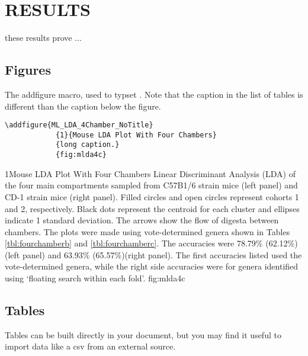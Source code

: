 
\setlength{\abovecaptionskip}{-5pt}
\setlength{\floatsep}{-5pt}
\setlength{\textfloatsep}{-5pt}

\chapter{RESULTS\label{ch:results}}

these results prove ...

\section{Figures} \label{sec:figures}

The addfigure macro, used to typset .  Note that the caption in the list of tables is different than the caption below the figure.
\begin{verbatim}
\addfigure{ML_LDA_4Chamber_NoTitle}
            {1}{Mouse LDA Plot With Four Chambers}
            {long caption.}
            {fig:mlda4c}
\end{verbatim}

            {1}{Mouse LDA Plot With Four Chambers}
            {Linear Discriminant Analysis (LDA) of the four main compartments sampled from C57B1/6 strain mice (left panel) and CD-1 strain mice (right panel). Filled circles and open circles represent cohorts 1 and 2, respectively. Black dots represent the centroid for each cluster and ellipses indicate 1 standard deviation. The arrows show the flow of digesta between chambers. The plots were made using vote-determined genera shown in Tables \ref{tbl:fourchamberb} and \ref{tbl:fourchamberc}. The accuracies were 78.79\% (62.12\%)(left panel) and 63.93\% (65.57\%)(right panel). The first accuracies listed used the vote-determined genera, while the right side accuracies were for genera identified using `floating search within each fold'.}
            {fig:mlda4c}

  \clearpage 

\section{Tables} \label{sec:tables}

Tables can be built directly in your document, but you may find it useful to import data like a csv from an external source.

